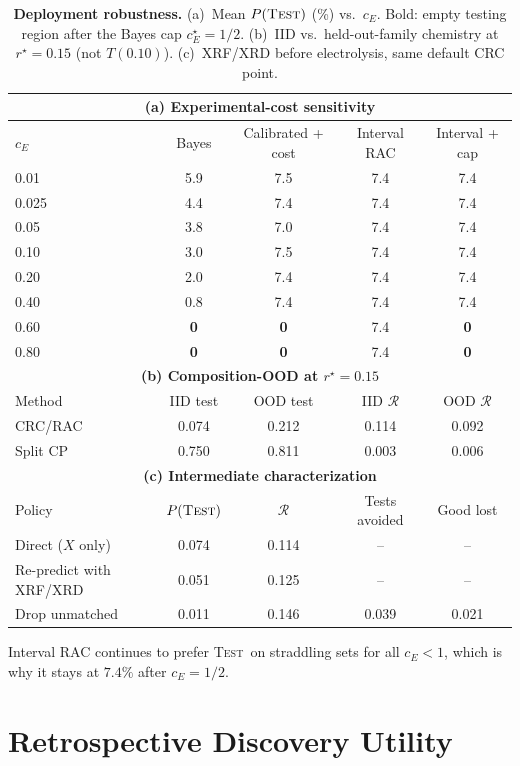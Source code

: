 \documentclass{article}
\newcommand{\test}{\textsc{Test}}
\newcommand{\risk}{\mathcal{R}}
\begin{document}
\begin{table}[h]
\centering
\caption{\textbf{Deployment robustness.}
(a)~Mean $P(\test)$ (\%) vs.\ $c_E$. Bold: empty testing region after the Bayes cap $c_E^\star=1/2$.
(b)~IID vs.\ held-out-family chemistry at $r^\star=0.15$ (not $T(0.10)$).
(c)~XRF/XRD before electrolysis, same default CRC point.}
\label{tab:app_robustness}
\small
\begin{tabular}{lcccc}
\toprule
\multicolumn{5}{c}{\textbf{(a) Experimental-cost sensitivity}}\\
\midrule
$c_E$ & Bayes & Calibrated + cost & Interval RAC & Interval + cap\\
\midrule
0.01  & 5.9 & 7.5 & 7.4 & 7.4\\
0.025 & 4.4 & 7.4 & 7.4 & 7.4\\
0.05  & 3.8 & 7.0 & 7.4 & 7.4\\
0.10  & 3.0 & 7.5 & 7.4 & 7.4\\
0.20  & 2.0 & 7.4 & 7.4 & 7.4\\
0.40  & 0.8 & 7.4 & 7.4 & 7.4\\
0.60  & \textbf{0} & \textbf{0} & 7.4 & \textbf{0}\\
0.80  & \textbf{0} & \textbf{0} & 7.4 & \textbf{0}\\
\midrule
\multicolumn{5}{c}{\textbf{(b) Composition-OOD at $r^\star=0.15$}}\\
\midrule
Method & IID test & OOD test & IID $\risk$ & OOD $\risk$\\
\midrule
CRC/RAC & 0.074 & 0.212 & 0.114 & 0.092\\
Split CP & 0.750 & 0.811 & 0.003 & 0.006\\
\midrule
\multicolumn{5}{c}{\textbf{(c) Intermediate characterization}}\\
\midrule
Policy & $P(\test)$ & $\risk$ & Tests avoided & Good lost\\
\midrule
Direct ($X$ only) & 0.074 & 0.114 & -- & --\\
Re-predict with XRF/XRD & 0.051 & 0.125 & -- & --\\
Drop unmatched & 0.011 & 0.146 & 0.039 & 0.021\\
\bottomrule
\end{tabular}
\end{table}

Interval RAC continues to prefer \test\ on straddling sets for all $c_E<1$, which is why it stays at $7.4\%$ after $c_E=1/2$.

\section{Retrospective Discovery Utility}
\label{app:discovery}
\end{document}
